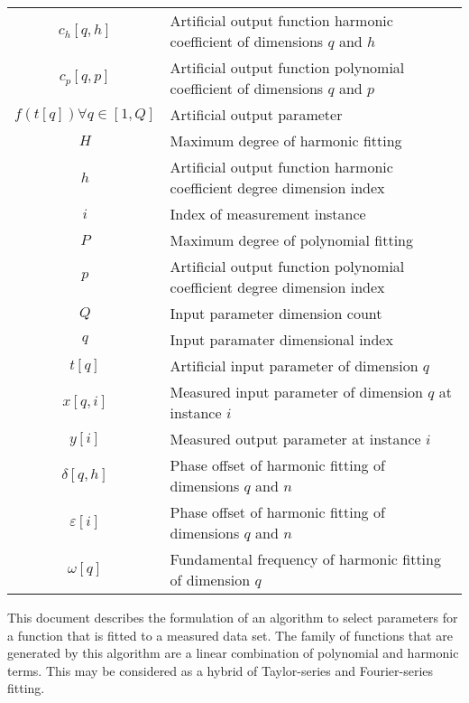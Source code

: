 \documentclass{article}
\begin{document}
\begin{table}[htbp]
\begin{tabular}{cl}
$c_h\left[q, h\right]$&Artificial output function harmonic coefficient of dimensions $q$ and $h$\\
$c_p\left[q, p\right]$&Artificial output function polynomial coefficient of dimensions $q$ and $p$\\
$f\left(t\left[q\right]\right) \forall q \in \left[1, Q\right]$&Artificial output parameter\\
$H$&Maximum degree of harmonic fitting\\
$h$&Artificial output function harmonic coefficient degree dimension index\\
$i$&Index of measurement instance\\
$P$&Maximum degree of polynomial fitting\\
$p$&Artificial output function polynomial coefficient degree dimension index\\
$Q$&Input parameter dimension count\\
$q$&Input paramater dimensional index\\
$t\left[q\right]$&Artificial input parameter of dimension $q$\\
$x\left[q, i\right]$&Measured input parameter of dimension $q$ at instance $i$\\
$y\left[i\right]$&Measured output parameter at instance $i$\\
$\delta\left[q, h\right]$&Phase offset of harmonic fitting of dimensions $q$ and $n$\\
$\varepsilon\left[i\right]$&Phase offset of harmonic fitting of dimensions $q$ and $n$\\
$\omega\left[q\right]$&Fundamental frequency of harmonic fitting of dimension $q$
\end{tabular}
\end{table}

\par{This document describes the formulation of an algorithm to select parameters for a function that is fitted to a measured data set. The family of functions that are generated by this algorithm are a linear combination of polynomial and harmonic terms. This may be considered as a hybrid of Taylor-series and Fourier-series fitting.}
\end{document}
